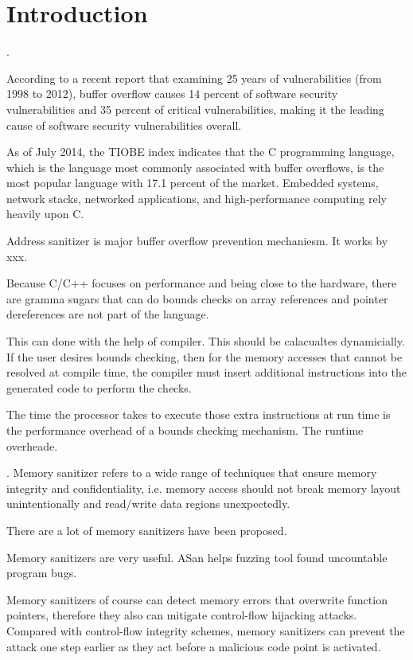\section{Introduction}

\renewcommand\yphn[1]{ \textcolor{blue} {\theintr.} \yphl{#1}}

\yphn{Memory errors}

According to a recent report that examining 25 years of vulnerabilities (from 1998 to 2012),
buffer overflow causes 14 percent of software security vulnerabilities and 35 percent of critical vulnerabilities,
making it the leading cause of software security vulnerabilities overall.

As of July 2014, the TIOBE index indicates that the C programming language,
which is the language most commonly associated with buffer overflows,
is the most popular language with 17.1 percent of the market.
Embedded systems, network stacks, networked applications, and high-performance computing rely heavily upon C.


Address sanitizer is major buffer overflow prevention mechaniesm.
It works by xxx.


Because C/C++ focuses on performance and being close to the hardware,
there are gramma sugars that can do bounds checks on array references and pointer dereferences are not part of the language.

This can done with the help of compiler.
This should be calacualtes dynamicially.
If the user desires bounds checking, then for the memory accesses that cannot be resolved at compile time, the compiler must insert additional instructions into the generated code to perform the checks.


The time the processor takes to execute those extra instructions at run time is the performance overhead of a bounds checking mechanism.
The runtime overheade.



\yphn{Sanitizer Introduction}
Memory sanitizer refers to a wide range of techniques that ensure memory integrity and confidentiality,
i.e. memory access should not break memory layout unintentionally and read/write data regions unexpectedly.

There are a lot of memory sanitizers have been proposed.

Memory sanitizers are very useful.
ASan helps fuzzing tool found uncountable program bugs.

Memory sanitizers of course can detect memory errors that overwrite function pointers,
therefore they also can mitigate control-flow hijacking attacks.
Compared with control-flow integrity schemes,
memory sanitizers can prevent the attack one step earlier as they act before a malicious code point is activated.


